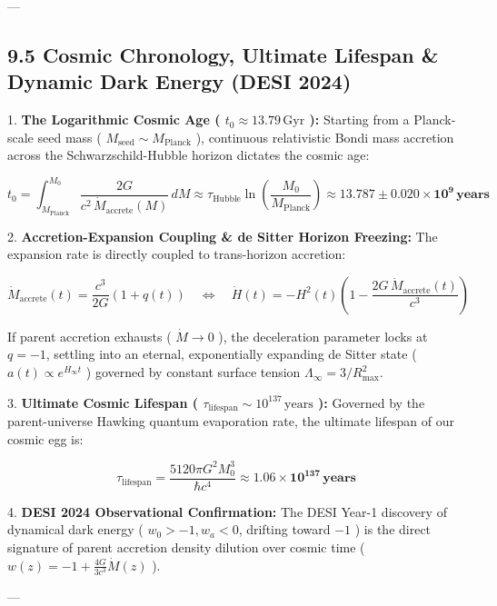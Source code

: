 \documentclass[11pt,a4paper]{article}
\theoremstyle{definition}
\theoremstyle{remark}
\begin{document}
---

\subsection{9.5 Cosmic Chronology, Ultimate Lifespan \& Dynamic Dark Energy (DESI 2024)}

1. \textbf{The Logarithmic Cosmic Age ( $t_0 \approx 13.79 \, \text{Gyr}$ ):}
Starting from a Planck-scale seed mass ( $M_{\text{seed}} \sim M_{\text{Planck}}$ ), continuous relativistic Bondi mass accretion across the Schwarzschild-Hubble horizon dictates the cosmic age:


\begin{equation}
t_0 = \int_{M_{\text{Planck}}}^{M_0} \frac{2G}{c^2 \, \dot{M}_{\text{accrete}}(M)} \, dM \approx \tau_{\text{Hubble}} \ln\left(\frac{M_0}{M_{\text{Planck}}}\right) \approx \mathbf{13.787 \pm 0.020 \times 10^9 \, \text{years}}
\end{equation}


2. \textbf{Accretion-Expansion Coupling \& de Sitter Horizon Freezing:}
The expansion rate is directly coupled to trans-horizon accretion:


\begin{equation}
\dot{M}_{\text{accrete}}(t) = \frac{c^3}{2G} (1 + q(t)) \quad \iff \quad \dot{H}(t) = -H^2(t) \left( 1 - \frac{2G \, \dot{M}_{\text{accrete}}(t)}{c^3} \right)
\end{equation}


If parent accretion exhausts ( $\dot{M} \to 0$ ), the deceleration parameter locks at $q = -1$, settling into an eternal, exponentially expanding de Sitter state ( $a(t) \propto e^{H_\infty t}$ ) governed by constant surface tension $\Lambda_\infty = 3 / R_{\text{max}}^2$.

3. \textbf{Ultimate Cosmic Lifespan ( $\tau_{\text{lifespan}} \sim 10^{137} \, \text{years}$ ):}
Governed by the parent-universe Hawking quantum evaporation rate, the ultimate lifespan of our cosmic egg is:


\begin{equation}
\tau_{\text{lifespan}} = \frac{5120 \pi G^2 M_0^3}{\hbar c^4} \approx \mathbf{1.06 \times 10^{137} \, \text{years}}
\end{equation}


4. \textbf{DESI 2024 Observational Confirmation:}
The DESI Year-1 discovery of dynamical dark energy ( $w_0 > -1, w_a < 0$, drifting toward $-1$ ) is the direct signature of parent accretion density dilution over cosmic time ( $w(z) = -1 + \frac{4G}{3 c^3}\dot{M}(z)$ ).

---
\end{document}

